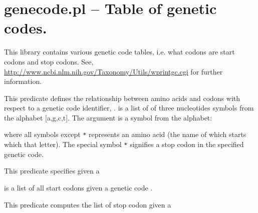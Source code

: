 


\section{genecode.pl -- Table of genetic codes.}

\label{sec:genecode}

This library contains various genetic code tables, i.e. what codons are start codons and stop codons.
See, \url{http://www.ncbi.nlm.nih.gov/Taxonomy/Utils/wprintgc.cgi} for further information.\vspace{0.7cm}

\begin{description}
This predicate defines the relationship between amino acids and codons with respect to a genetic code identifier, .
 is a list of of three nucleotides symbols from the alphabet [a,g,c,t].
The argument  is a symbol from the alphabet:

\begin{code}
[a,c,d,e,f,g,h,i,k,l,m,n,p,q,r,s,t,v,w,y,*]
\end{code}

where all symbols except \verb$*$ represents an amino acid (the name of which starts which that letter).
The special symbol \verb$*$ signifies a stop codon in the specified genetic code.

This predicate specifies  given a 

 is a list of all start codons given a genetic code .

This predicate computes the list of stop codon given a 
\end{description}

